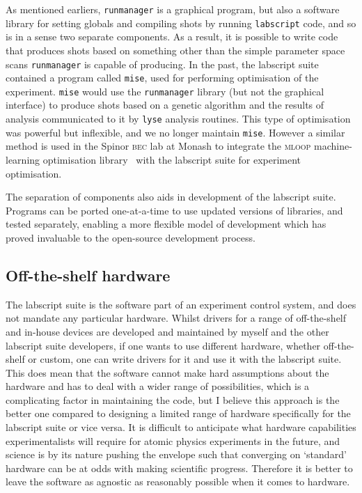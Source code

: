 As mentioned earliers, \texttt{runmanager} is a graphical program, but also a software library for setting globals and compiling shots by running \texttt{labscript} code, and so is in a sense two separate components. As a result, it is possible to write code that produces shots based on something other than the simple parameter space scans \texttt{runmanager} is capable of producing. In the past, the labscript suite contained a program called \texttt{mise}, used for performing optimisation of the experiment. \texttt{mise} would use the \texttt{runmanager} library (but not the graphical interface) to produce shots based on a genetic algorithm and the results of analysis communicated to it by \texttt{lyse} analysis routines. This type of optimisation was powerful but inflexible, and we no longer maintain \texttt{mise}. However a similar method is used in the Spinor \textsc{bec} lab at Monash to integrate the \textsc{mloop} machine-learning optimisation library~\cite{wigley_fast_2016} with the labscript suite for experiment optimisation.

The separation of components also aids in development of the labscript suite. Programs can be ported one-at-a-time to use updated versions of libraries, and tested separately, enabling a more flexible model of development which has proved invaluable to the open-source development process. 


\subsection{Off-the-shelf hardware}

The labscript suite is the software part of an experiment control system, and does not mandate any particular hardware. Whilst drivers for a range of off-the-shelf and in-house devices are developed and maintained by myself and the other labscript suite developers, if one wants to use different hardware, whether off-the-shelf or custom, one can write drivers for it and use it with the labscript suite. This does mean that the software cannot make hard assumptions about the hardware and has to deal with a wider range of possibilities, which is a complicating factor in maintaining the code, but I believe this approach is the better one compared to designing a limited range of hardware specifically for the labscript suite or vice versa. It is difficult to anticipate what hardware capabilities experimentalists will require for atomic physics experiments in the future, and science is by its nature pushing the envelope such that converging on `standard' hardware can be at odds with making scientific progress. Therefore it is better to leave the software as agnostic as reasonably possible when it comes to hardware.

